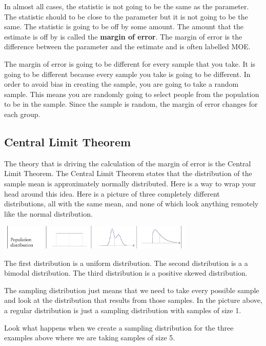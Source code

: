 \documentclass[
  letterpaper,
  DIV=11,
  numbers=noendperiod]{scrreprt}
\begin{document}
In almost all cases, the statistic is not going to be the same as the
parameter. The statistic should to be close to the parameter but it is
not going to be the same. The statistic is going to be off by some
amount. The amount that the estimate is off by is called the
\textbf{margin of error}. The margin of error is the difference between
the parameter and the estimate and is often labelled MOE.

The margin of error is going to be different for every sample that you
take. It is going to be different because every sample you take is going
to be different. In order to avoid bias in creating the sample, you are
going to take a random sample. This means you are randomly going to
select people from the population to be in the sample. Since the sample
is random, the margin of error changes for each group.

\subsection*{Central Limit Theorem}\label{central-limit-theorem}

The theory that is driving the calculation of the margin of error is the
Central Limit Theorem. The Central Limit Theorem states that the
distribution of the sample mean is approximately normally distributed.
Here is a way to wrap your head around this idea. Here is a picture of
three completely different distributions, all with the same mean, and
none of which look anything remotely like the normal distribution.

\includegraphics[width=0.7\textwidth,height=\textheight]{./images/EPCI_4.jpg}

The first distribution is a uniform distribution. The second
distribution is a a bimodal distribution. The third distribution is a
positive skewed distribution.

The sampling distribution just means that we need to take every possible
sample and look at the distribution that results from those samples. In
the picture above, a regular distribution is just a sampling
distribution with samples of size 1.

Look what happens when we create a sampling distribution for the three
examples above where we are taking samples of size 5.
\end{document}
